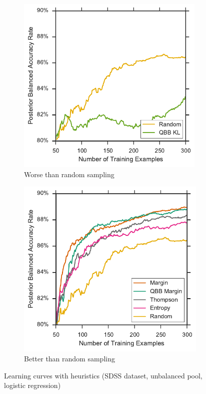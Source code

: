 \begin{figure}[p]
	\centering
	\begin{subfigure}{.5\textwidth}
		\centering
		\includegraphics[width=0.99\textwidth]{figures/5_active/sdss_ul_ind_lower}
		\caption{Worse than random sampling}
		\label{fig:sdss_ul_ind_lower}
	\end{subfigure}%
	\begin{subfigure}{.5\textwidth}
		\centering
		\includegraphics[width=0.99\linewidth]{figures/5_active/sdss_ul_ind_upper}
		\caption{Better than random sampling}
		\label{fig:sdss_ul_ind_upper}
	\end{subfigure}
	\caption[Learning curves with heuristics (SDSS, balanced, logistic)]{
		Learning curves with heuristics (SDSS dataset, unbalanced pool, logistic regression)}
	\label{fig:sdss_ul_ind}
\end{figure}

